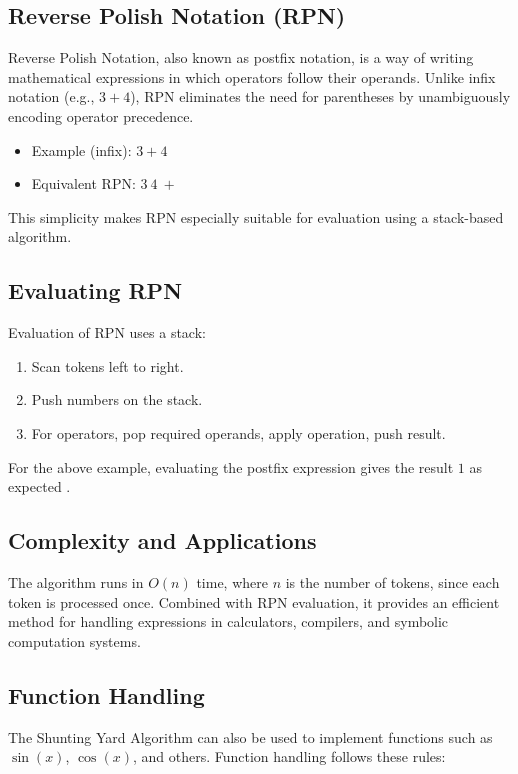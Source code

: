 \documentclass[conference]{IEEEtran}
\begin{document}
\subsection{Reverse Polish Notation (RPN)}
Reverse Polish Notation, also known as postfix notation, is a way of writing mathematical expressions in which 
operators follow their operands. Unlike infix notation (e.g., $3 + 4$), RPN eliminates the need for parentheses by 
unambiguously encoding operator precedence.

\begin{itemize}
    \item Example (infix): $3 + 4$
    \item Equivalent RPN: $3 \ 4 \ +$
\end{itemize}

This simplicity makes RPN especially suitable for evaluation using a stack-based algorithm.


\subsection{Evaluating RPN}
Evaluation of RPN uses a stack:
\begin{enumerate}
    \item Scan tokens left to right.
    \item Push numbers on the stack.
    \item For operators, pop required operands, apply operation, push result.
\end{enumerate}

For the above example, evaluating the postfix expression gives the result $1$ as expected .

\subsection{Complexity and Applications}
The algorithm runs in $O(n)$ time, where $n$ is the number of tokens, since each token is processed once.  
Combined with RPN evaluation, it provides an efficient method for handling expressions in calculators, compilers, and symbolic computation systems.

\subsection{Function Handling}
The Shunting Yard Algorithm can also be used to implement functions such as $\sin(x)$, $\cos(x)$, and others. Function handling follows these rules:
\end{document}
